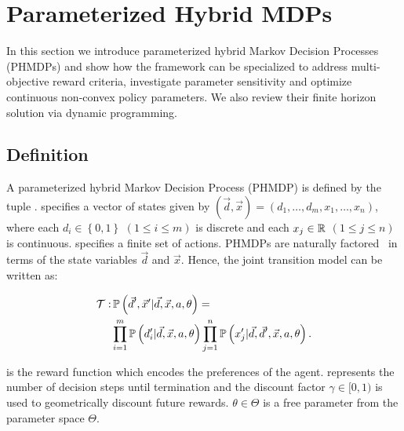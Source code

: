 \section{Parameterized Hybrid MDPs}
\label{sec:hybrid_mdps}

In this section we introduce parameterized hybrid Markov Decision
Processes (PHMDPs) and show how the framework can be specialized to
address multi-objective reward criteria, investigate parameter
sensitivity and optimize continuous non-convex policy parameters. We
also review their finite horizon solution via dynamic programming.

\subsection{Definition}
\label{sec:hybrid_mdps_def}

A parameterized hybrid Markov Decision Process (PHMDP) is defined by
the tuple {\footnotesize \PMDPTuple}. {\footnotesize \State} specifies
a vector of states given by {\footnotesize $(\vec{d}, \vec{x}) =
  \left( d_1, \ldots, d_m, x_1, \ldots, x_n \right) $}, where each
{\footnotesize $ d_i \in \left\lbrace 0, 1 \right\rbrace $}
{\footnotesize $\left( 1 \leq i \leq m \right)$} is discrete and each
{\footnotesize$ x_j \in \mathbb{R} $} {\footnotesize $\left( 1 \leq j \leq
  n \right)$} is continuous. {\footnotesize \Action} specifies a
finite set of actions. PHMDPs are naturally
factored~\parencite{Boutilier_JAIR_1999} in terms of the state
variables {\footnotesize$\vec{d}$} and {\footnotesize
  $\vec{x}$}. Hence, the joint transition model can be written as:

{\footnotesize
\abovedisplayskip=0pt
\belowdisplayskip=0pt
\begin{align}
    \label{eq:hmdp_tfunc}
    \mathcal{T} :& \, \mathbb{P}\left({\vec{d}', \vec{x}' | \vec{d}, \vec{x}, a, \theta}\right) = \nonumber \\
    & \prod_{i=1}^{m} \mathbb{P}\left({d_i' | \vec{d}, \vec{x}, a, \theta}\right) \prod_{j=1}^{n} \mathbb{P}\left({x_j' | \vec{d}, \vec{d}', \vec{x}, a, \theta}\right).
\end{align}   
}

{\footnotesize \RewardFunc} is the reward function which encodes the
preferences of the agent. {\footnotesize \Horizon} represents the
number of decision steps until termination and the discount factor
{\footnotesize $\gamma \in [0, 1)$} is used to geometrically discount
  future rewards. {\footnotesize $\theta \in \Theta$} is a free
  parameter from the parameter space {\footnotesize $ \Theta $}.


